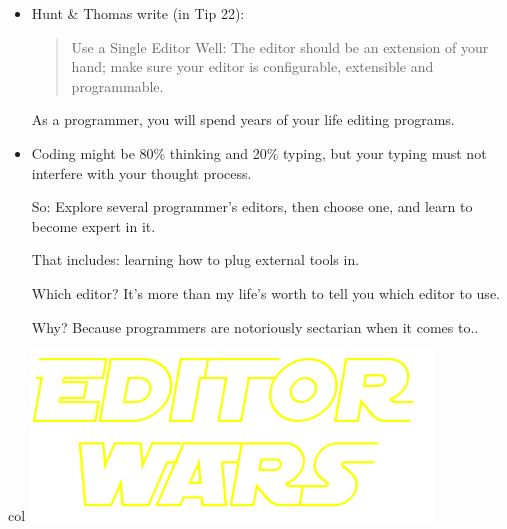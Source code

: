 \documentclass[handout]{beamer}
\begin{document}
\begin{frame}
  \begin{itemize}
    \item
	  Hunt \& Thomas write (in Tip 22):
\begin{quote}
Use a Single Editor Well:
The editor should be an extension of your hand;
make sure your editor is configurable,
extensible and programmable.
\end{quote}
    \pitem
    As a programmer, you will spend \alert{years of your life} editing programs.

    \item
    Coding might be 80\% thinking and 20\% typing, but your
    typing must not interfere with your thought process.

    \pitem
    So: Explore several programmer's editors, then choose one,
    and learn to become \alert{expert in it}.

    \pitem
    That includes: learning \alert{how to plug external tools in}.

    \pitem
    Which editor?
    \pause
    It's more than my life's worth to tell you which editor to use.

    \pitem
    Why? Because programmers are notoriously sectarian when it comes to..
  \end{itemize}
\end{frame}

\begin{frame}[plain]
\begin{beamercolorbox}[wd=1.1\textwidth, ht=1.1\textheight]{col}
\centering
\vspace{70pt}
\includegraphics[width=0.8\textwidth]{editorWars.png}
\end{beamercolorbox}
\end{frame}
\end{document}
